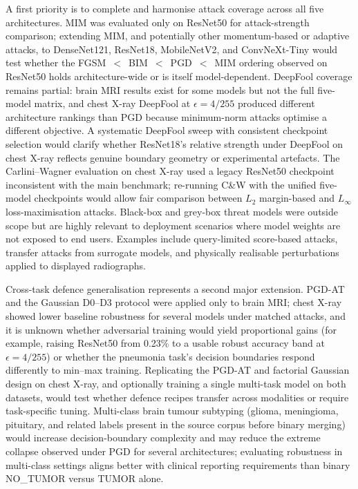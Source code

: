 \documentclass[12pt,a4paper,oneside]{report}
\begin{document}
A first priority is to complete and harmonise attack coverage across all five architectures. MIM was evaluated only on ResNet50 for attack-strength comparison; extending MIM, and potentially other momentum-based or adaptive attacks, to DenseNet121, ResNet18, MobileNetV2, and ConvNeXt-Tiny would test whether the FGSM~$<$~BIM~$<$~PGD~$<$~MIM ordering observed on ResNet50 holds architecture-wide or is itself model-dependent. DeepFool coverage remains partial: brain MRI results exist for some models but not the full five-model matrix, and chest X-ray DeepFool at $\epsilon = 4/255$ produced different architecture rankings than PGD because minimum-norm attacks optimise a different objective. A systematic DeepFool sweep with consistent checkpoint selection would clarify whether ResNet18's relative strength under DeepFool on chest X-ray reflects genuine boundary geometry or experimental artefacts. The Carlini--Wagner evaluation on chest X-ray used a legacy ResNet50 checkpoint inconsistent with the main benchmark; re-running C\&W with the unified five-model checkpoints would allow fair comparison between $L_2$ margin-based and $L_\infty$ loss-maximisation attacks. Black-box and grey-box threat models were outside scope but are highly relevant to deployment scenarios where model weights are not exposed to end users. Examples include query-limited score-based attacks, transfer attacks from surrogate models, and physically realisable perturbations applied to displayed radiographs.

Cross-task defence generalisation represents a second major extension. PGD-AT and the Gaussian D0--D3 protocol were applied only to brain MRI; chest X-ray showed lower baseline robustness for several models under matched attacks, and it is unknown whether adversarial training would yield proportional gains (for example, raising ResNet50 from 0.23\% to a usable robust accuracy band at $\epsilon = 4/255$) or whether the pneumonia task's decision boundaries respond differently to min--max training. Replicating the PGD-AT and factorial Gaussian design on chest X-ray, and optionally training a single multi-task model on both datasets, would test whether defence recipes transfer across modalities or require task-specific tuning. Multi-class brain tumour subtyping (glioma, meningioma, pituitary, and related labels present in the source corpus before binary merging) would increase decision-boundary complexity and may reduce the extreme collapse observed under PGD for several architectures; evaluating robustness in multi-class settings aligns better with clinical reporting requirements than binary NO\_TUMOR versus TUMOR alone.
\end{document}
